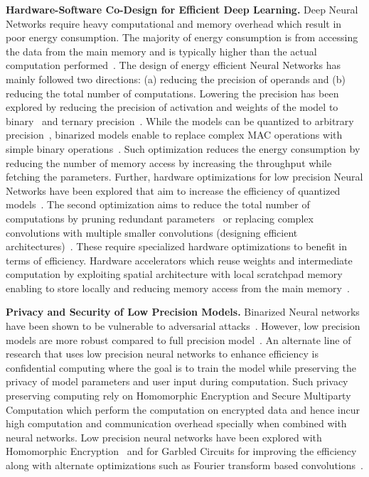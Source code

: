 \noindent\textbf{Hardware-Software Co-Design for Efficient Deep Learning.} Deep Neural Networks require heavy computational and memory overhead which result in poor energy consumption.
The majority of energy consumption is from accessing the data from the main memory and is typically higher than the actual computation performed~\cite{6757323}.
The design of energy efficient Neural Networks has mainly followed two directions: (a) reducing the precision of operands and (b) reducing the total number of computations.
Lowering the precision has been explored by reducing the precision of activation and weights of the model to binary~\cite{NIPS2015_5647, NIPS2016_6573} and ternary precision~\cite{Li2016TernaryWN,DBLP:journals/corr/ZhuHMD16}.
While the models can be quantized to arbitrary precision~\cite{Hubara:2017:QNN:3122009.3242044}, binarized models enable to replace complex MAC operations with simple binary operations~\cite{rastegari2016xnornet,DBLP:journals/corr/ZhouNZWWZ16}.
Such optimization reduces the energy consumption by reducing the number of memory access by increasing the throughput while fetching the parameters.
Further, hardware optimizations for low precision Neural Networks have been explored that aim to increase the efficiency of quantized models~\cite{AndCav2016YodaNN,Umuroglu2017FINNAF}.
The second optimization aims to reduce the total number of computations by pruning redundant parameters~\cite{Han:2015:LBW:2969239.2969366} or replacing complex convolutions with multiple smaller convolutions (designing efficient architectures)~\cite{conf/cvpr/SandlerHZZC18,46505,eccv_2018_yang_netadapt,DBLP:journals/corr/IandolaMAHDK16}.
These require specialized hardware optimizations to benefit in terms of efficiency.
Hardware accelerators which reuse weights and intermediate computation by exploiting spatial architecture with local scratchpad memory enabling to store locally and reducing memory access from the main memory~\cite{7551407,10.1109/ISCA.2016.30}.


\noindent\textbf{Privacy and Security of Low Precision Models.} Binarized Neural networks have been shown to be vulnerable to adversarial attacks~\cite{galloway2018attacking,khalil2018combinatorial}.
However, low precision models are more robust compared to full precision model~\cite{lin2018defensive}.
An alternate line of research that uses low precision neural networks to enhance efficiency is confidential computing where the goal is to train the model while preserving the privacy of model parameters and user input during computation.
Such privacy preserving computing rely on Homomorphic Encryption and Secure Multiparty Computation which perform the computation on encrypted data and hence incur high computation and communication overhead specially when combined with neural networks.
Low precision neural networks have been explored with Homomorphic Encryption~\cite{Bourse2017FastHE} and for Garbled Circuits\cite{235489} for improving the efficiency along with alternate optimizations such as Fourier transform based convolutions~\cite{Li2018FALCONAF}.
